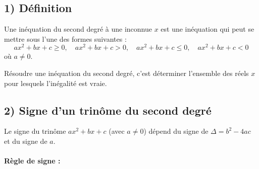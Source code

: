 \documentclass[12pt,a4paper]{article}
\begin{document}
\subsection*{\color{myred} 1) Définition}
Une inéquation du second degré à une inconnue $x$ est une inéquation qui peut se mettre sous l'une des formes suivantes :
\[
ax^2 + bx + c \geq 0, \quad ax^2 + bx + c > 0, \quad ax^2 + bx + c \leq 0, \quad ax^2 + bx + c < 0
\]
où $a \neq 0$.

Résoudre une inéquation du second degré, c'est déterminer l'ensemble des réels $x$ pour lesquels l'inégalité est vraie.

\subsection*{\color{myred} 2) Signe d'un trinôme du second degré}
Le signe du trinôme $ax^2 + bx + c$ (avec $a \neq 0$) dépend du signe de $\Delta = b^2 - 4ac$ et du signe de $a$.

\paragraph*{\color{myred} Règle de signe :}
\end{document}
